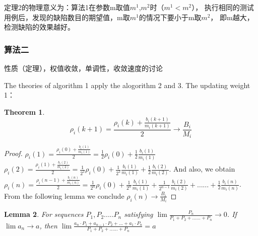 \documentclass[10pt,journal,letterpaper,compsoc]{IEEEtran}
\newtheorem{thm}{Theorem}[section]
\newtheorem{lemma}[thm]{Lemma}
\begin{document}
\begin{CJK}{UTF8}{gkai}
定理2的物理意义为：算法1在参数m取值$m^1$,$m^2$时（$m^1<m^2$），
执行相同的测试用例后，发现的缺陷数目的期望值，m取$m^1$的情况下要小于m取$m^2$，
即m越大，检测缺陷的效果越好。
    \subsubsection{ 算法二}性质（定理），权值收敛，单调性，收敛速度的讨论

The theories of algorithm 1 apply the alogorithm 2 and 3. 
The updating weight 1：
\begin{thm}
\begin{equation} 
\rho _i(k+1)= \frac{\rho_i(k)+\frac {b_i(k+1)}{m_i(k+1)}}{2} \rightarrow  \frac{B_i}{M_i}
\end{equation}
\end{thm}

\begin{proof}
$\rho_i(1)= \frac{\rho_i(0)+\frac {b_i(1)}{m_i(1)}}{2}
=\frac{1}{2}\rho_i(0)+\frac{1}{2}\frac{b_i(1)}{m_i(1)}$
\\$\rho_i(2)= \frac{\rho_i(1)+\frac {b_i(2)}{m_i(2)}}{2}
=\frac{1}{2^2}\rho_i(0)+\frac{1}{2^2}\frac{b_i(1)}{m_i(1)}
+\frac{1}{2}\frac{b_i(2)}{m_i(2)}$.
And also, we obtain  $\rho_i(n)= \frac{\rho_i(n-1)+\frac {b_i(n)}{m_i(n)}}{2}
=\frac{1}{2^n}\rho_i(0)+\frac{1}{2^n}\frac{b_i(1)}{m_i(1)}
+\frac{1}{2^{n-1}}\frac{b_i(2)}{m_i(2)}+……+\frac{1}{2}\frac{b_i(n)}{m_i(n)}$.
From the following lemma we conclude $\rho_i(n)\rightarrow\frac{B_i}{M_i}$
\end{proof}

\begin{lemma}
For sequences $P_1,P_2.....P_n$
satisfying $ \lim \frac{P_n}{P_1+P_2+......+P_n} \rightarrow 0 $.
If $\lim a_n \rightarrow a$,
then $\lim \frac{a_n \cdot P_1+a_{n-1} \cdot P_2+...+a_1\cdot P_n}{P_1+P_2+......+P_n}=a$
\end{lemma}


\end{CJK}
\end{document}
